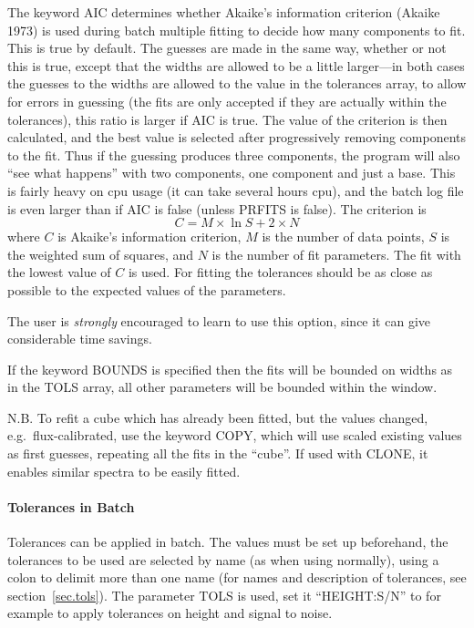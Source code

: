 The keyword AIC determines whether Akaike's information criterion
(Akaike 1973) is used during batch multiple fitting to decide how many
components to fit.
This is true by default.
The guesses are made in the same way, whether or not this is true,
except that the widths are allowed to be a little larger---in both cases
the guesses to the widths are allowed to the value in the tolerances
array, to allow for errors in guessing (the fits are only accepted if
they are actually within the tolerances), this  ratio is larger if AIC
is true.
The value of the criterion is then calculated, and the best value is
selected after progressively removing components to the fit.
Thus if the guessing produces three components, the program will also
``see what happens'' with two components, one component and just a base.
This is fairly heavy on cpu usage (it can take several hours cpu), and
the batch log file is even larger than if AIC is false (unless PRFITS is
false).
The criterion is
\[
C = M \times \ln S + 2 \times N
\]
where $C$ is Akaike's information criterion, $M$ is the number of data
points, $S$ is the weighted sum of squares, and $N$ is the number of fit
parameters.
The fit with the lowest value of $C$ is used.
For fitting the tolerances should be as close as possible to the
expected values of the parameters.

The user is {\em strongly} encouraged to learn to use this option, since
it can give considerable time savings.

If the keyword BOUNDS is specified then the fits will be bounded on
widths as in the TOLS array, all other parameters will be bounded
within the window.

N.B. To refit a cube which has already been fitted, but the values
changed, e.g.\ flux-calibrated, use the keyword COPY, which will use
scaled existing values as first guesses, repeating all the fits in the
``cube''.
If used with CLONE, it enables similar spectra to be easily fitted.

\paragraph{Tolerances in Batch}

Tolerances can be applied in batch.
The values must be set up beforehand, the tolerances to be used are
selected by name (as when using normally), using a colon to delimit more
than one name (for names and description of tolerances, see
section~\ref{sec.tols}).
The parameter TOLS is used, set it ``HEIGHT:S/N'' to for example to
apply tolerances on height and signal to noise.

